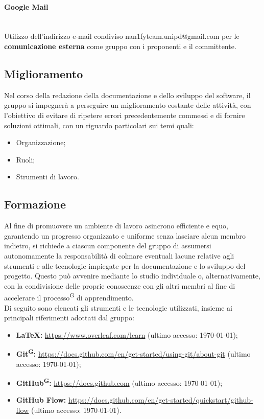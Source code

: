 \documentclass[8pt]{article}
\newcommand{\glossterm}[1]{#1\textsuperscript{G}} %
\newcommand{\subsubsubsection}[1]{\paragraph{#1}\mbox{}\\}
\begin{document}
\subsubsubsection{Google Mail}
Utilizzo dell'indirizzo e-mail condiviso nan1fyteam.unipd@gmail.com per le \textbf{comunicazione esterna} come gruppo con i proponenti e il committente.

\subsection{Miglioramento} \label{sec:miglioramento}
Nel corso della redazione della documentazione e dello sviluppo del software, il gruppo si impegnerà a perseguire un miglioramento costante delle attività, con l'obiettivo di evitare di ripetere errori precedentemente commessi e di fornire soluzioni ottimali, con un riguardo particolari sui temi quali:
\begin{itemize}
  \item Organizzazione;
  \item Ruoli;
  \item Strumenti di lavoro.
\end{itemize}
\subsection{Formazione} \label{sec:formazione}
Al fine di promuovere un ambiente di lavoro asincrono efficiente e equo, garantendo un progresso organizzato e uniforme senza lasciare alcun membro indietro, si richiede a ciascun componente del gruppo di assumersi autonomamente la responsabilità di colmare eventuali lacune relative agli strumenti e alle tecnologie impiegate per la documentazione e lo sviluppo del progetto. Questo può avvenire mediante lo studio individuale o, alternativamente, con la condivisione delle proprie conoscenze con gli altri membri al fine di accelerare il \glossterm{processo} di apprendimento.
\\Di seguito sono elencati gli strumenti e le tecnologie utilizzati, insieme ai principali riferimenti adottati dal gruppo:
\begin{itemize}
    \item \textbf{LaTeX:} \href{https://www.overleaf.com/learn}{https://www.overleaf.com/learn}
        (ultimo accesso: \today);
    \item \textbf{\glossterm{Git}:}
        \href{https://docs.github.com/en/get-started/using-git/about-git.}{https://docs.github.com/en/get-started/using-git/about-git}
        (ultimo accesso: \today);
    \item \textbf{\glossterm{GitHub}:} \href{https://docs.github.com}{https://docs.github.com} (ultimo accesso: \today);
    \item \textbf{GitHub Flow:}
        \href{https://docs.github.com/en/get-started/quickstart/github-flow}{https://docs.github.com/en/get-started/quickstart/github-flow}
        (ultimo accesso: \today).
\end{itemize}
\clearpage
\end{document}
